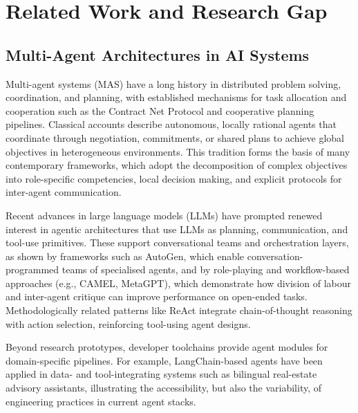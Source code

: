\documentclass[oneside,10pt]{swissi}
\begin{document}
\section{Related Work and Research Gap}\label{sec2}
\subsection{Multi-Agent Architectures in AI Systems}

Multi-agent systems (MAS) have a long history in distributed problem solving, coordination, and planning, with established mechanisms for task allocation and cooperation such as the Contract Net Protocol and cooperative planning pipelines.\cite{smith1980contractnet,torreno2017survey} Classical accounts describe autonomous, locally rational agents that coordinate through negotiation, commitments, or shared plans to achieve global objectives in heterogeneous environments.\cite{jennings1998roadmap,wooldridge2009} This tradition forms the basis of many contemporary frameworks, which adopt the decomposition of complex objectives into role-specific competencies, local decision making, and explicit protocols for inter-agent communication.\cite{jennings1998roadmap,torreno2017survey}

Recent advances in large language models (LLMs) have prompted renewed interest in agentic architectures that use LLMs as planning, communication, and tool-use primitives. These support conversational teams and orchestration layers, as shown by frameworks such as AutoGen, which enable conversation-programmed teams of specialised agents, and by role-playing and workflow-based approaches (e.g., CAMEL, MetaGPT), which demonstrate how division of labour and inter-agent critique can improve performance on open-ended tasks.\cite{wu2023autogen,li2023camel,hong2023metagpt} Methodologically related patterns like ReAct integrate chain-of-thought reasoning with action selection, reinforcing tool-using agent designs.\cite{yao2023react}

Beyond research prototypes, developer toolchains provide agent modules for domain-specific pipelines. For example, LangChain-based agents have been applied in data- and tool-integrating systems such as bilingual real-estate advisory assistants, illustrating the accessibility, but also the variability, of engineering practices in current agent stacks.\cite{haurum2024langchain}
\end{document}
